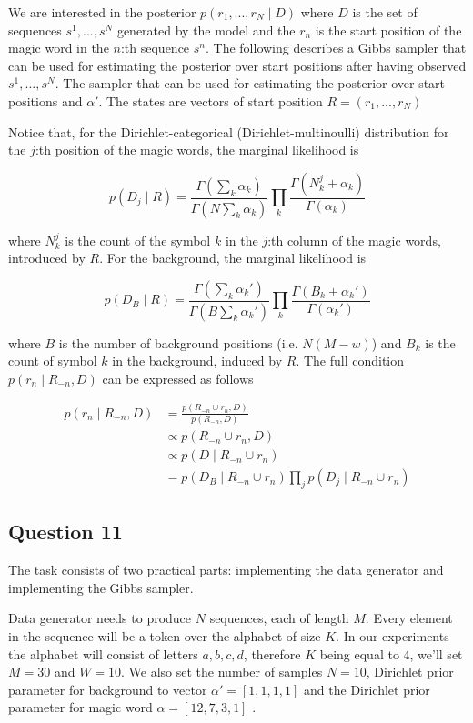 \documentclass[]{article}
\begin{document}
	We are interested in the posterior $p(r_1,...,r_N \mid D)$ where $D$ is the set of sequences $ s^1, ..., s^N$ generated by the model and the $r_n$ is the start position of the magic word in the $n$:th sequence $s^n$. The following describes a Gibbs sampler that can be used for estimating the posterior over start positions after having observed $s^1, ..., s^N$. The sampler that can be used for estimating the posterior over start positions and $\alpha'$. The states are vectors of start position $R= (r_1,...,r_N)$
	
	Notice that, for the Dirichlet-categorical (Dirichlet-multinoulli) distribution for the $j$:th position of the magic words, the marginal likelihood is 
	
	$$ p(D_j \mid R) = \frac{\Gamma(\sum_k \alpha_k)}{\Gamma(N \sum_k \alpha_k)} \prod_k \frac{\Gamma( N_k^j + \alpha_k)}{\Gamma(\alpha_k)} $$
	
	where $N_k^j$ is the count of the symbol $k$ in the $j$:th column of the magic words, introduced by $R$. For the background, the marginal likelihood is 
	
	$$ p(D_B \mid R) = \frac{\Gamma(\sum_k \alpha_k')}{\Gamma(B \sum_k \alpha_k')} \prod_k \frac{\Gamma( B_k + \alpha_k')}{\Gamma(\alpha_k')} $$
	
	where $B$ is the number of background positions (i.e. $N(M-w)$) and $B_k$ is the count of symbol $k$ in the background, induced by $R$. The full condition $p(r_n \mid R_{-n}, D)$ can be expressed as follows
	
	\begin{align*}
	p(r_n \mid R_{-n}, D) &= \frac{p(R_{-n} \cup r_n, D)}{p(R_{-n}, D)} \\
	& \propto p(R_{-n} \cup r_n, D) \\
	& \propto p(D \mid R_{-n} \cup r_n) \\
	& = p(D_B \mid R_{-n} \cup r_n) \prod_j p(D_j \mid R_{-n} \cup r_n)
	\end{align*}
	
	
	\subsection*{Question 11}
	
	The task consists of two practical parts: implementing the data generator and implementing the Gibbs sampler. 
	
	Data generator needs to produce $N$ sequences, each of length $M$. Every element in the sequence will be a token over the alphabet of size $K$. In our experiments the alphabet will consist of letters $a,b,c,d$, therefore $K$ being equal to $4$, we'll set $M=30$ and $W=10$. We also set the number of samples $N=10$, Dirichlet prior parameter for background  to vector $\alpha' = [1,1,1,1]$ and the Dirichlet prior parameter for magic word  $\alpha = [12,7,3,1]$ .
	
\end{document}
